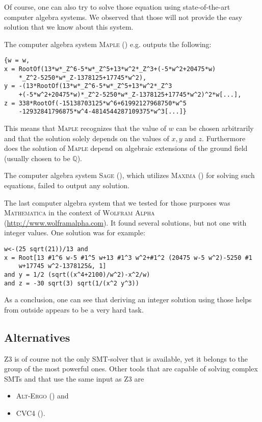 \documentclass[oribibl]{llncs}
\newcommand{\QQ}{{\mathbb{Q}}}
\begin{document}
Of course, one can also try to solve those equation using
state-of-the-art computer algebra systems. We observed that those will
not provide the easy solution that we know about this system.

The computer algebra system \textsc{Maple} (\cite{Maple}) e.g. outputs the following:
\begin{verbatim}
{w = w,
x = RootOf(13*w*_Z^6-5*w*_Z^5+13*w^2*_Z^3+(-5*w^2+20475*w)
    *_Z^2-5250*w*_Z-1378125+17745*w^2),
y = -(13*RootOf(13*w*_Z^6-5*w*_Z^5+13*w^2*_Z^3
    +(-5*w^2+20475*w)*_Z^2-5250*w*_Z-1378125+17745*w^2)^2*w[...],
z = 338*RootOf(-15138703125*w^6+61992127968750*w^5
    -12932841796875*w^4-4814544287109375*w^3[...]}
\end{verbatim}

This means that \textsc{Maple} recognizes that the value of $w$ can be
chosen arbitrarily and that the solution solely depends on the values
of $x,y$ and $z$. Furthermore does the solution of \textsc{Maple}
depend on algebraic extensions of the ground field (usually chosen to
be $\QQ$).

The computer algebra system \textsc{Sage} (\cite{sage}), which utilizes
\textsc{Maxima} (\cite{maxima}) for solving such equations, failed to
output any solution.

The last computer algebra system that we tested for those purposes was
\textsc{Mathematica} \cite{wolfram1999mathematica} in the context of
\textsc{Wolfram Alpha}\\ (\url{http://www.wolframalpha.com}). It found
several solutions, but not one with integer values. One solution was
for example:
\begin{verbatim}
w<-(25 sqrt(21))/13 and 
x = Root[13 #1^6 w-5 #1^5 w+13 #1^3 w^2+#1^2 (20475 w-5 w^2)-5250 #1
    w+17745 w^2-1378125&, 1]
and y = 1/2 (sqrt((x^4+2100)/w^2)-x^2/w)
and z = -30 sqrt(3) sqrt(1/(x^2 y^3))
\end{verbatim}

As a conclusion, one can see that deriving an integer solution using
those helps from outside appears to be a very hard task.

\subsection{Alternatives}

\textsc{Z3} is of course not the only \textsc{SMT}-solver that is
available, yet it belongs to the group of the most powerful
ones. Other tools that are capable of solving complex SMTs and that use the
same input as \textsc{Z3} are
\begin{itemize}
  \item \textsc{Alt-Ergo} (\cite{bobotalt}) and
  \item \textsc{CVC4} (\cite{barrett2011cvc4}).
\end{itemize}
\end{document}
